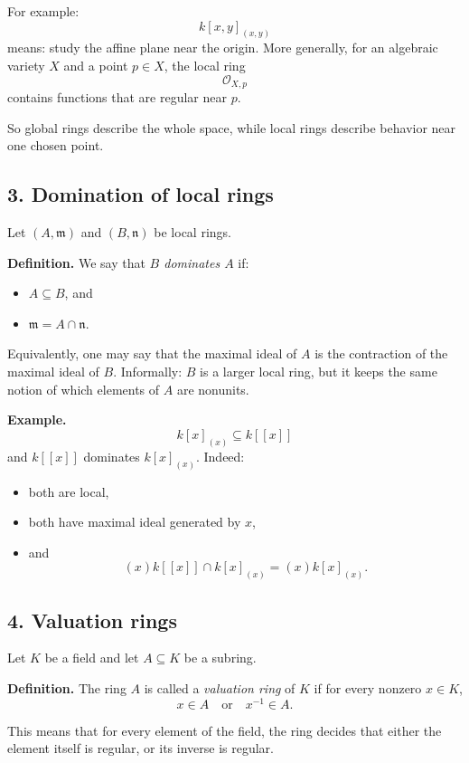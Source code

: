 \documentclass[12pt,a4paper]{article}
\theoremstyle{notespace}
\begin{document}
For example:
\[
k[x,y]_{(x,y)}
\]
means: study the affine plane near the origin. More generally, for an algebraic variety \(X\) and a point \(p\in X\), the local ring
\[
\mathcal O_{X,p}
\]
contains functions that are regular near \(p\).

So global rings describe the whole space, while local rings describe behavior near one chosen point.

\subsection*{3. Domination of local rings}

Let \((A,\mathfrak m)\) and \((B,\mathfrak n)\) be local rings.

\textbf{Definition.}
We say that \emph{\(B\) dominates \(A\)} if:
\begin{itemize}
	\item \(A\subseteq B\), and
	\item \(\mathfrak m = A\cap \mathfrak n\).
\end{itemize}

Equivalently, one may say that the maximal ideal of \(A\) is the contraction of the maximal ideal of \(B\). Informally: \(B\) is a larger local ring, but it keeps the same notion of which elements of \(A\) are nonunits.

\textbf{Example.}
\[
k[x]_{(x)} \subseteq k[[x]]
\]
and \(k[[x]]\) dominates \(k[x]_{(x)}\). Indeed:
\begin{itemize}
	\item both are local,
	\item both have maximal ideal generated by \(x\),
	\item and
	\[
	(x)k[[x]]\cap k[x]_{(x)}=(x)k[x]_{(x)}.
	\]
\end{itemize}

\subsection*{4. Valuation rings}

Let \(K\) be a field and let \(A\subseteq K\) be a subring.

\textbf{Definition.}
The ring \(A\) is called a \emph{valuation ring} of \(K\) if for every nonzero \(x\in K\),
\[
x\in A \quad \text{or} \quad x^{-1}\in A.
\]

This means that for every element of the field, the ring decides that either the element itself is regular, or its inverse is regular.
\end{document}
